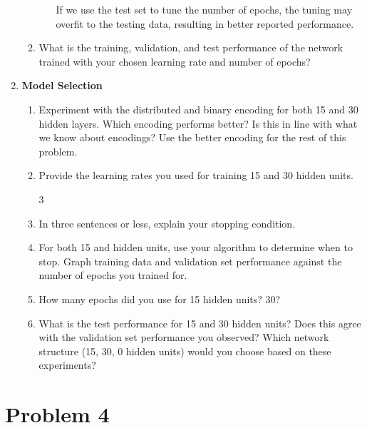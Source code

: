 \documentclass{article}
\begin{document}
\begin{enumerate}
\begin{enumerate}
\begin{enumerate}
        If we use the test set to tune the number of epochs, the tuning may 
        overfit to the testing data, resulting in better reported performance. 

      \end{enumerate}
    \item What is the training, validation, and test performance of the
      network trained with your chosen learning rate and number of epochs?

    \end{enumerate}

  \item \textbf{Model Selection}
    \begin{enumerate}
    \item Experiment with the distributed and binary encoding for both 15 and
      30 hidden layers. Which encoding performs better? Is this in line with what
      we know about encodings? Use the better encoding for the rest of this problem.

    \item Provide the learning rates you used for training 15 and 30 hidden units.

      \setcounter{enumii}3

    \item In three sentences or less, explain your stopping condition. 

    \item For both 15 and hidden units, use your algorithm to determine when to stop.
      Graph training data and validation set performance against the number of
      epochs you trained for.

    \item How many epochs did you use for 15 hidden units? 30?

    \item What is the test performance for 15 and 30 hidden units? Does this agree
      with the validation set performance you observed? Which network structure
      (15, 30, 0 hidden units) would you choose based on these experiments?


    \end{enumerate}


  \end{enumerate}

  \section*{Problem 4}
\end{document}
